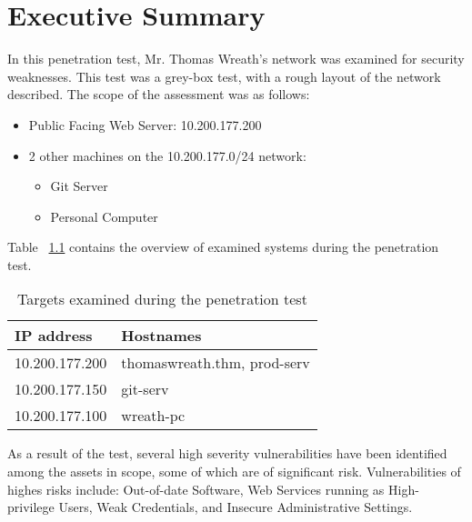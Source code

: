 \chapter{Executive Summary}

In this penetration test, Mr. Thomas Wreath's network was examined for security weaknesses. This test was a grey-box test, with a rough layout of the network described. The scope of the assessment was as follows:
\begin{itemize}
	\item Public Facing Web Server: 10.200.177.200
	\item 2 other machines on the 10.200.177.0/24 network:
	\begin{itemize}
    \item Git Server
    \item Personal Computer
	\end{itemize}
\end{itemize}

Table ~\ref{tbl:targets} contains the overview of examined systems during the penetration test.
\begin{table}[h]
	\centering
	\begin{tabular}{|l|l|}
		\hline
		\textbf{IP address} & \textbf{Hostnames}\\
		\hline
		10.200.177.200 & thomaswreath.thm, prod-serv\\
		\hline
		10.200.177.150 & git-serv\\
		\hline
		10.200.177.100 & wreath-pc\\
		\hline
	\end{tabular}
	\caption{Targets examined during the penetration test}
	\label{tbl:targets}
\end{table}

As a result of the test, several high severity vulnerabilities have been identified among the assets in scope, some of which are of significant risk. Vulnerabilities of highes risks include: Out-of-date Software, Web Services running as High-privilege Users, Weak Credentials, and Insecure Administrative Settings.
